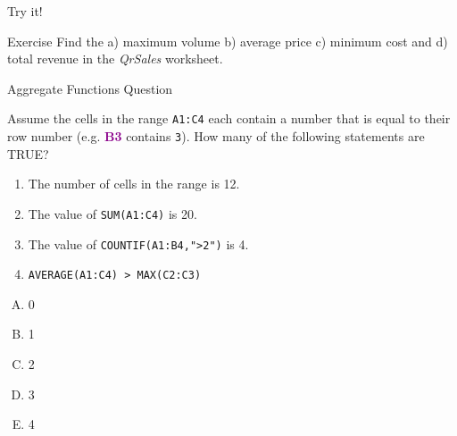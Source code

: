 \documentclass[xcolor=svgnames]{beamer}
\newcommand{\cell}[1]{{\sf \textbf{\textcolor{DarkMagenta}{#1}}}}
\begin{document}
\begin{frame}{Try it!}
\begin{exampleblock}{Exercise}
Find the a) maximum volume b) average price c) minimum cost and d) total revenue in the \textit{QrSales} worksheet.
\end{exampleblock}
\end{frame}


\begin{frame}{Aggregate Functions Question}
  \begin{example}
Assume the cells in the range {\tt A1:C4} each contain a number that is equal to their row number (e.g. \cell{B3} contains {\tt 3}). How many of the following statements are TRUE?
\begin{enumerate}
\item The number of cells in the range is 12.
\item The value of {\tt SUM(A1:C4)} is 20.
\item The value of {\tt COUNTIF(A1:B4,">2")} is 4.
\item {\tt AVERAGE(A1:C4) > MAX(C2:C3)}
\end{enumerate}
\begin{multicols}{5}
\begin{enumerate}[A)]
\item 0 
\item 1
\item 2
\item 3
\item 4
\end{enumerate}
\end{multicols}
  \end{example} 
\end{frame}
\end{document}
